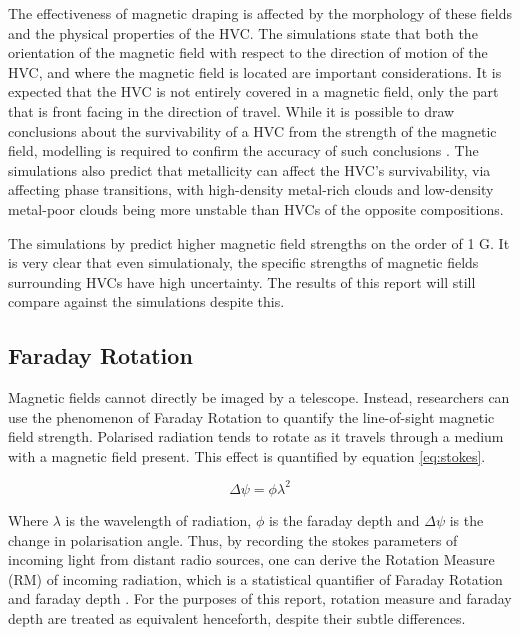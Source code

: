 The effectiveness of magnetic draping is affected by the morphology of these fields and the physical properties of the HVC. The \citeauthor{ID23} simulations state that both the orientation of the magnetic field with respect to the direction of motion of the HVC, and where the magnetic field is located are important considerations. It is expected that the HVC is not entirely covered in a magnetic field, only the part that is front facing in the direction of travel. While it is possible to draw conclusions about the survivability of a HVC from the strength of the magnetic field, modelling is required to confirm the accuracy of such conclusions \citep{ID5}. The \citeauthor{ID23} simulations also predict that metallicity can affect the HVC's survivability, via affecting phase transitions, with high-density metal-rich clouds and low-density metal-poor clouds being more unstable than HVCs of the opposite compositions.


The simulations by \cite{ID34} predict higher magnetic field strengths on the order of 1 \textmu G. It is very clear that even simulationaly, the specific strengths of magnetic fields surrounding HVCs have high uncertainty. The results of this report will still compare against the \citeauthor{ID23} simulations despite this.


\subsection{Faraday Rotation}
\label{ssec:faraday}

Magnetic fields cannot directly be imaged by a telescope. Instead, researchers can use the phenomenon of Faraday Rotation to quantify the line-of-sight magnetic field strength. Polarised radiation tends to rotate as it travels through a medium with a magnetic field present. This effect is quantified by equation \ref{eq:stokes}.

\begin{equation}
    \Delta\psi = \phi\lambda^2
    \label{eq:stokes}
\end{equation}


Where $\lambda$ is the wavelength of radiation, $\phi$ is the faraday depth and $\Delta\psi$ is the change in polarisation angle. Thus, by recording the stokes parameters of incoming light from distant radio sources, one can derive the Rotation Measure (RM) of incoming radiation, which is a statistical quantifier of Faraday Rotation and faraday depth \citep{ID1, ID14}. For the purposes of this report, rotation measure and faraday depth are treated as equivalent henceforth, despite their subtle differences.


